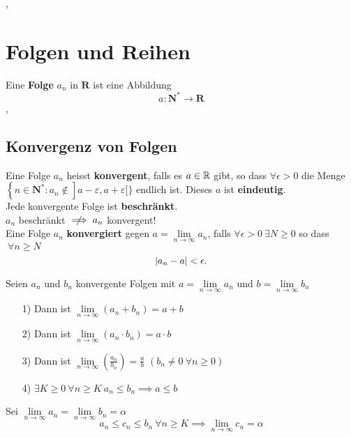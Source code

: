 \sep
\section{Folgen und Reihen}

\Def[2.1.1] Eine \textbf{Folge} $a_n$ in $\mathbf{R}$ ist eine Abbildung
\[
a: \mathbf{N}^{*} \longrightarrow \mathbf{R}
\] 
\sep
\subsection{Konvergenz von Folgen}

\Def[2.1.4] Eine Folge $a_n$ heisst \textbf{konvergent}, falls es $a \in \mathbb{R}$ gibt, so dass $\forall \epsilon > 0$ die Menge
$
\left\{n \in \mathbf{N}^{*}: a_{n} \notin\right] a-\varepsilon, a+\varepsilon[\}
$ endlich ist.
\Lemma[2.1.3] Dieses $a$ ist \textbf{eindeutig}. \\

\Lemma[2.1.5] Jede konvergente Folge ist \textbf{beschränkt}. \\
\Achtung $a_{n}$ beschränkt $\centernot\implies a_{n}$ konvergent! \\

\Lemma[2.1.6] Eine Folge $a_n$ \textbf{konvergiert} gegen ${a = \lim\limits_{n \rightarrow \infty} a_{n}}$, falls $ \forall \epsilon > 0 \ \exists N \geq 0$ so dass $\ \forall n\geq N$
\[
 \left\lvert a_n-a \right\rvert < \epsilon.
\]

\Satz[2.1.8] Seien $a_n$ und $b_n$ konvergente Folgen mit $a = \lim\limits_{n \rightarrow \infty} a_{n}$ und  $b = \lim\limits_{n \rightarrow \infty} b_{n}$
\begin{enumerate}
\item[1)] Dann ist $\lim\limits_{n \rightarrow \infty} (a_{n} + b_{n}) = a + b$
\item[2)] Dann ist $\lim\limits_{n \rightarrow \infty} (a_{n} \cdot b_{n}) = a \cdot b$
\item[3)] Dann ist $\lim\limits_{n \rightarrow \infty} (\frac{a_{n}}{b_{n}}) = \frac{a}{b}$ $(b_{n} \neq 0 \ \forall n \geq 0)$
\item[4)] $\exists K \geq 0 \ \forall n \geq K \ a_{n} \leq b_{n} \implies a \leq b$

\end{enumerate}

 Sei $\lim\limits_{n \rightarrow \infty} a_{n} = \lim\limits_{n \rightarrow \infty} b_{n} = \alpha$ 
\[
a_{n} \leq c_{n} \leq b_{n} \ \forall n \geq K \implies \lim\limits_{n \rightarrow \infty} c_{n} = \alpha
\]

